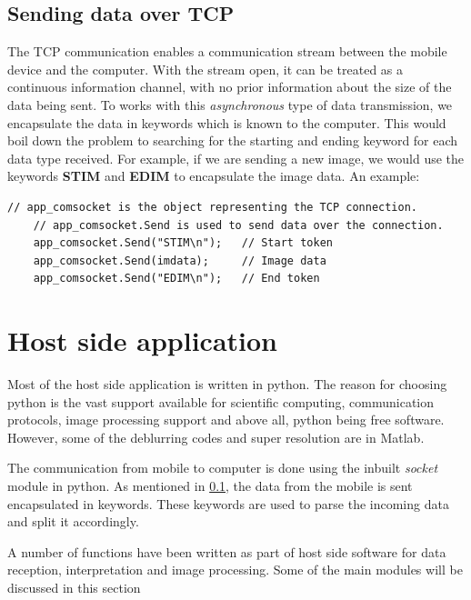 \documentclass[BTech]{iitmdiss}
\begin{document}
\subsection{Sending data over TCP}
\label{device:device_app:tcp}
The TCP communication enables a communication stream between the mobile
device and the computer. With the stream open, it can be treated as a 
continuous information channel, with no prior information about the size
of the data being sent. To works with this \emph{asynchronous} type of
data transmission, we encapsulate the data in keywords which is known to
the computer. This would boil down the problem to searching for the 
starting and ending keyword for each data type received. For example, if
we are sending a new image, we would use the keywords \textbf{STIM} and
\textbf{EDIM} to encapsulate the image data. An example: 

\begin{singlespacing}
\begin{lstlisting}[style=sharpclisting]
    // app_comsocket is the object representing the TCP connection.
    // app_comsocket.Send is used to send data over the connection.
    app_comsocket.Send("STIM\n");   // Start token
    app_comsocket.Send(imdata);     // Image data
    app_comsocket.Send("EDIM\n");   // End token
\end{lstlisting}
\end{singlespacing}

\section{Host side application}
\label{device:host}
Most of the host side application is written in python. The reason for 
choosing python is the vast support available for scientific computing,
communication protocols, image processing support and above all, python
being free software. However, some of the deblurring codes and 
super resolution are in Matlab.

The communication from mobile to computer is done using the inbuilt
\emph{socket} module in python. As mentioned in 
\ref{device:device_app:tcp}, the data from the mobile is sent
encapsulated in keywords. These keywords are used to parse the incoming
data and split it accordingly. 

A number of functions have been written as part of host side software
for data reception, interpretation and image processing. Some of the 
main modules will be discussed in this section
\end{document}
